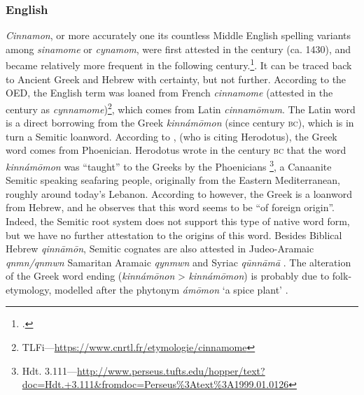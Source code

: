
\subsubsection{English}
\label{sec:cinnamon_names_en}



\textit{Cinnamon}, or more accurately one its countless Middle English spelling variants among \textit{sinamome} or \textit{cynamom}, were first attested in the  century (ca. 1430), and became relatively more frequent in the following  century.\footcite[s.v. cinnamon]{oed}. It can be traced back to Ancient Greek and Hebrew with certainty, but not further. According to the \gls{OED}, the English term was loaned from French \textit{cinnamome} (attested in the  century as \textit{cynnamome})\footnote{\gls{TLFi}---\url{https://www.cnrtl.fr/etymologie/cinnamome}}, which comes from Latin \textit{cinnamōmum}. The Latin word is a direct borrowing from the Greek  \textit{kinnámōmon} (since  century \textsc{bc}), which is in turn a Semitic loanword. According to \textcite[701]{beekes_etymological_2010}, (who is citing Herodotus), the Greek word comes from Phoenician. Herodotus wrote in the  century \textsc{bc} that the word \textit{kinnámōmon} was ``taught'' to the Greeks by the Phoenicians \autocite[139]{herodotus_herodotus_1921}\footnote{Hdt. 3.111---\url{http://www.perseus.tufts.edu/hopper/text?doc=Hdt.+3.111&fromdoc=Perseus\%3Atext\%3A1999.01.0126}}, a Canaanite Semitic speaking seafaring people, originally from the Eastern Mediterranean, roughly around today’s Lebanon. According to \textcite[585]{klein_comprehensive_1987} however, the Greek is a loanword from Hebrew, and he observes that this word seems to be ``of foreign origin''. Indeed, the Semitic root system does not support this type of native word form, but we have no further attestation to the origins of this word. Besides Biblical Hebrew 
\textit{qinnāmōn}, Semitic cognates are also attested in Judeo-Aramaic \textit{qnmn/qnmwn} Samaritan Aramaic \textit{qynmwn} and Syriac \textit{qūnnāmā} \autocite{rosol_early_2018}. The alteration of the Greek word ending (\textit{kinnámōnon} > \textit{kinnámōmon}) is probably due to folk-etymology, modelled after the \gls{phytonym}  \textit{ámōmon} `a spice plant' \autocites{beekes_etymological_2010, klein_comprehensive_1987}. 
    
